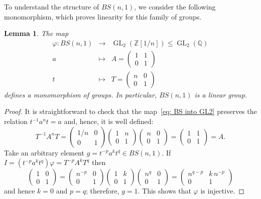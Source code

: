 \documentclass[english]{amsart}
\newtheorem{lem}[thm]{Lemma}
\theoremstyle{definition}
\newcommand\ZZ{\mathbb{Z}}
\newcommand{\QQ}{{\mathbb Q}}
\newcommand{\GL}{\operatorname{GL}}
\begin{document}
To understand the structure of $BS(n,1)$, we consider the following monomorphism, which proves linearity for this family of groups. 

\begin{lem}\label{linearity}
The map
 \begin{equation}\label{eq: BS into GL2}
\begin{array}{rcl} \varphi\colon BS(n,1) & \to & \GL_2(\ZZ[1/n])\leqslant \GL_2(\QQ) \\[3pt] a & \mapsto & A=\left(\begin{smallmatrix} 1 & 1 \\ 0 & 1 \end{smallmatrix}\right) \\[3pt] t & \mapsto & T=\left(\begin{smallmatrix} n & 0 \\ 0 & 1 \end{smallmatrix}\right) \end{array}
 \end{equation}
defines a monomorphism of groups. In particular, $BS(n,1)$ is a linear group. 
\end{lem}

\begin{proof}
It is straightforward to check that the map~\eqref{eq: BS into GL2} preserves the relation $t^{-1}a^n t=a$ and, hence, it is well defined:
 $$
T^{-1} A^n T=\begin{pmatrix} 1/n & 0 \\ 0 & 1 \end{pmatrix}
\begin{pmatrix} 1 & n \\ 0 & 1 \end{pmatrix} \begin{pmatrix} n & 0 \\ 0 & 1 \end{pmatrix}=\begin{pmatrix} 1 & 1 \\ 0 & 1 \end{pmatrix}=A.
 $$
Take an arbitrary element $g=t^{-p}a^kt^q\in BS(n,1)$. If $I=(t^{-p}a^kt^q)\varphi =T^{-p} A^k T^q$ then
 $$
\begin{pmatrix} 1 & 0 \\ 0 & 1 \end{pmatrix}= \begin{pmatrix} n^{-p} & 0 \\ 0 & 1 \end{pmatrix} \begin{pmatrix} 1 & k \\ 0 & 1 \end{pmatrix} \begin{pmatrix} n^q & 0 \\ 0 & 1 \end{pmatrix} =\begin{pmatrix} n^{q-p} & k\,n^{-p} \\ 0 & 1 \end{pmatrix}
 $$
and hence $k=0$ and $p=q$; therefore, $g=1$. This shows that $\varphi$ is injective.
\end{proof}
\end{document}
